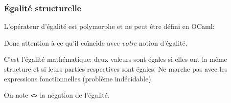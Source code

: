 %
\begin{frame}
\frametitle{Égalité structurelle}

L'opérateur d'égalité est polymorphe et ne peut être défini en OCaml:

\bigskip

\topin{( = )}


\bigskip

Donc attention à ce qu'il coïncide avec \emph{votre} notion d'égalité.

C'est l'égalité mathématique: deux valeurs sont égales si elles ont la
même structure et si leurs parties respectives sont égales. Ne marche
pas avec les expressions fonctionnelles (problème indécidable).

\bigskip





\bigskip

On note \texttt{<>} la négation de l'égalité.

\end{frame}
